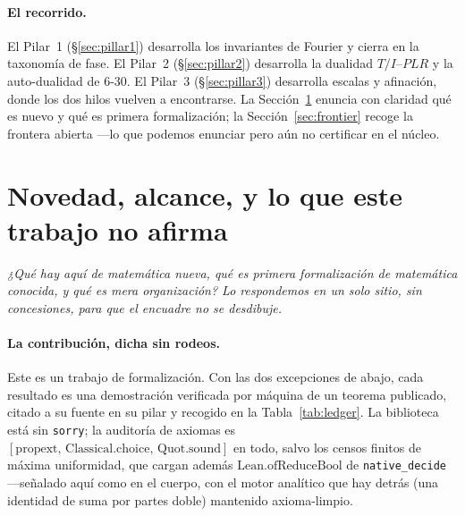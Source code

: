 \documentclass[11pt]{article}
\newcommand{\lean}[1]{\texttt{#1}}
\newcommand{\question}[1]{\smallskip\noindent\textit{#1}\smallskip}
\begin{document}
\paragraph{El recorrido.} El Pilar~1 (\S\ref{sec:pillar1}) desarrolla los invariantes de Fourier y cierra
en la taxonomía de fase. El Pilar~2 (\S\ref{sec:pillar2}) desarrolla la dualidad $T/I$--$PLR$ y la
auto-dualidad de 6-30. El Pilar~3 (\S\ref{sec:pillar3}) desarrolla escalas y afinación, donde los dos
hilos vuelven a encontrarse. La Sección~\ref{sec:novelty} enuncia con claridad qué es nuevo y qué es
primera formalización; la Sección~\ref{sec:frontier} recoge la frontera abierta ---lo que podemos
enunciar pero aún no certificar en el núcleo.


\section{Novedad, alcance, y lo que este trabajo no afirma}\label{sec:novelty}

\question{¿Qué hay aquí de matemática nueva, qué es primera formalización de matemática conocida, y qué es
mera organización? Lo respondemos en un solo sitio, sin concesiones, para que el encuadre no se desdibuje.}

\paragraph{La contribución, dicha sin rodeos.} Este es un trabajo de formalización. Con las dos
excepciones de abajo, cada resultado es una demostración verificada por máquina de un teorema
publicado, citado a su fuente en su pilar y recogido en la Tabla~\ref{tab:ledger}. La biblioteca está sin
\lean{sorry}; la auditoría de axiomas es $[\mathrm{propext},\,\mathrm{Classical.choice},\,
\mathrm{Quot.sound}]$ en todo, salvo los censos finitos de máxima uniformidad, que cargan además
$\mathrm{Lean.ofReduceBool}$ de \lean{native\_decide} ---señalado aquí como en el cuerpo, con el motor
analítico que hay detrás (una identidad de suma por partes doble) mantenido axioma-limpio.
\end{document}
